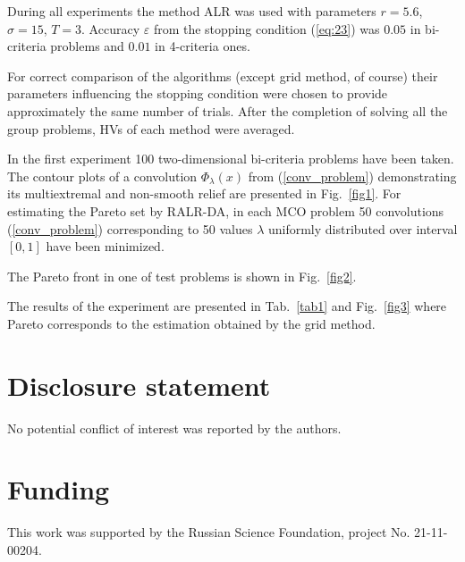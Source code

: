 \documentclass[]{interact}
\theoremstyle{plain}%
\theoremstyle{definition}
\theoremstyle{remark}
\begin{document}
During all experiments the method ALR was used with parameters $r=5.6$, $\sigma = 15$, $T=3$. Accuracy $\varepsilon$ from the stopping condition (\ref{eq:23}) was $0.05$ in bi-criteria problems and $0.01$ in 4-criteria ones.

For correct comparison of the algorithms (except grid method, of course) their parameters influencing the stopping condition were chosen to provide approximately the same number of trials. After the completion of solving all the group problems, HVs of each method were averaged.

In the first experiment 100 two-dimensional bi-criteria problems have been taken. The contour plots of a convolution $\Phi_\lambda(x)$ from (\ref{conv_problem})  demonstrating its multiextremal and non-smooth relief are presented in Fig.~\ref{fig1}. For estimating the Pareto set by RALR-DA, in each MCO problem 50 convolutions (\ref{conv_problem}) corresponding to 50 values $\lambda$ uniformly distributed over interval $[0,1]$ have been minimized.


The Pareto front in one of test problems is shown in Fig.~\ref{fig2}.


The results of the experiment are presented in Tab.~\ref{tab1} and Fig.~\ref{fig3} where Pareto corresponds to the estimation obtained by the grid method.



\section*{Disclosure statement}

No potential conflict of interest was reported by the authors.

\section*{Funding}

This work was supported by the Russian Science Foundation, project No. 21-11-00204.





\end{document}
